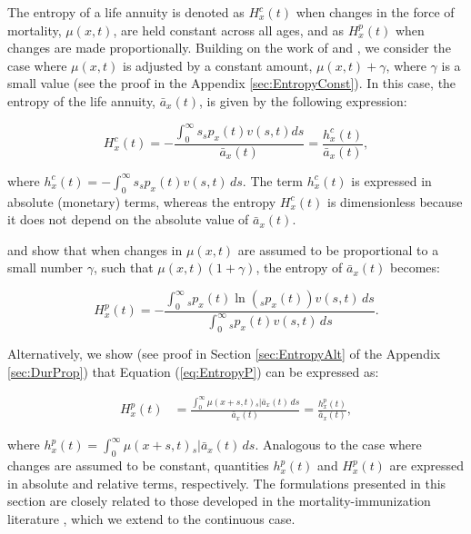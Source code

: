 \documentclass[12pt]{article}
\begin{document}
The entropy of a life annuity is denoted as ${H}^{c}_{x}(t)$ when changes in the force of mortality, $\mu(x,t)$, are held constant across all ages, and as ${H}^{p}_{x}(t)$ when changes are made proportionally. Building on the work of \citet{Tsai2013a} and \citet{Lin2020}, we consider the case where $\mu(x,t)$ is adjusted by a constant amount, $\mu(x,t) + \gamma$, where $\gamma$ is a small value (see the proof in the Appendix \ref{sec:EntropyConst}). In this case, the entropy of the life annuity, $\bar{a}_x(t)$, is given by the following expression:


\begin{equation}\label{eq:EntropyC}
{H}^{c}_{x}(t) = -\frac{\int_{0}^\infty s {}_sp_x(t) {v}(s,t) ds}{\bar{a}_x(t)}=\frac{{h}^{c}_{x}(t)}{\bar{a}_x(t)},
\end{equation}

where ${h}^{c}_{x}(t)=-\int_{0}^\infty s {}_s p_x(t) {v}(s,t) \, ds$. The term ${h}^{c}_{x}(t)$ is expressed in absolute (monetary) terms, whereas the entropy ${H}^{c}_{x}(t)$ is dimensionless because it does not depend on the absolute value of $\bar{a}_x(t)$.

\citet{Haberman2011} and \citet{Tsai2013a} show that when changes in $\mu(x,t)$ are assumed to be proportional to a small number $\gamma$, such that $\mu(x,t)(1+\gamma)$, the entropy of $\bar{a}_x(t)$ becomes:

\begin{equation} \label{eq:EntropyP}
	{H}^{p}_{x}(t) = -\frac{ \int_{0}^{\infty}{}_s p_x(t)\ln\left({}_s p_x(t)\right) {v}(s,t) \, ds}{\int_0^\infty {}_s p_x(t) {v}(s,t) \, ds}.
\end{equation}

Alternatively, we show (see proof in Section \ref{sec:EntropyAlt} of the Appendix \ref{sec:DurProp}) that Equation (\ref{eq:EntropyP}) can be expressed as:

\begin{equation} \label{eq:EntropyP2}
	\begin{split}
		{H}^{p}_{x}(t) &=  \frac{\int_0^\infty \mu(x+s,t)   {}_s|\bar{a}_x(t) \, ds}{\bar{a}_x(t)} =  \frac{{h}^{p}_{x}(t)}{\bar{a}_x(t)}, 
	\end{split}
\end{equation}

where ${h}^{p}_{x}(t)=\int_0^\infty \mu(x+s,t)   {}_s|\bar{a}_x(t) \, ds$. Analogous to the case where changes are assumed to be constant, quantities ${h}^{p}_{x}(t)$ and ${H}^{p}_{x}(t)$ are expressed in absolute and relative terms, respectively. The formulations presented in this section are closely related to those developed in the mortality-immunization literature \citep{Tsai2013a,Lin2020}, which we extend to the continuous case.
\end{document}
